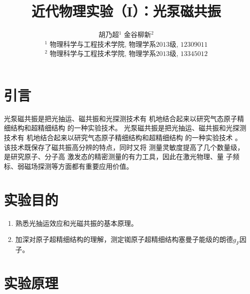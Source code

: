 \documentclass[11pt,a4paper]{article}
\title{近代物理实验（I）：光泵磁共振}
\author{胡乃超$^1$ \hspace{1cm}  金谷柳新$^2$\\
\footnotesize{ $^1$ 物理科学与工程技术学院, 物理学系$2013$级, $12309011$} \\
\footnotesize{ $^2$ 物理科学与工程技术学院, 物理学系$2013$级, $13345012$}}
\date{}
\begin{document}
\begin{spacing}{1.3}
\begin{CJK*}{UTF8}{gbsn}
\maketitle
\section{引言}
光泵磁共振是把光抽运、磁共振和光探测技术有
机地结合起来以研究气态原子精细结构和超精细结构
的一种实验技术。
光泵磁共振是把光抽运、磁共振和光探测技术有
机地结合起来以研究气态原子精细结构和超精细结构
的一种实验技术 。
该技术既保存了磁共振高分辨的特点，同时又将
测量灵敏度提高了几个数量级，是研究原子、分子高
激发态的精密测量的有力工具，因此在激光物理、量
子频标、弱磁场探测等方面都有重要应用价值。
\section{实验目的}
\begin{enumerate}
\item 	熟悉光抽运效应和光磁共振的基本原理。
\item   加深对原子超精细结构的理解，测定铷原子超精细结构塞曼子能级的朗德$g_F$因子。
\end{enumerate}

\section{实验原理}

\end{CJK*}
\end{spacing}
\end{document}

